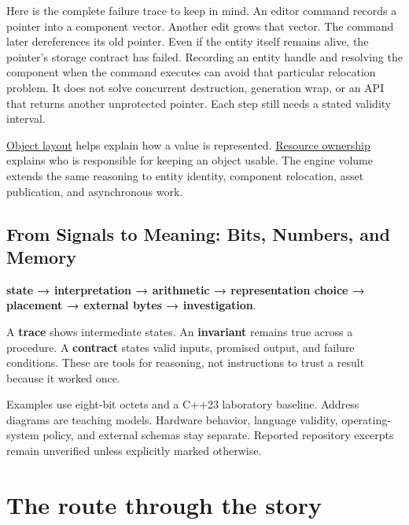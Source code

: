 Here is the complete failure trace to keep in mind. An editor command records a pointer into a component vector. Another edit grows that vector. The command later dereferences its old pointer. Even if the entity itself remains alive, the pointer's storage contract has failed. Recording an entity handle and resolving the component when the command executes can avoid that particular relocation problem. It does not solve concurrent destruction, generation wrap, or an API that returns another unprotected pointer. Each step still needs a stated validity interval.

\hyperref[appendix-c4ac6bb0fff8]{Object layout} helps explain how a value is represented. \hyperref[appendix-69739d3ab49b]{Resource ownership} explains who is responsible for keeping an object usable. The engine volume extends the same reasoning to entity identity, component relocation, asset publication, and asynchronous work.

\subsection{From Signals to Meaning: Bits, Numbers, and Memory}\label{01-foundations-i-ch001-from-signals-to-meaning-bits-numbers-and-memory}

\textbf{state → interpretation → arithmetic → representation choice → placement → external bytes → investigation}.

A \textbf{trace} shows intermediate states. An \textbf{invariant} remains true across a procedure. A \textbf{contract} states valid inputs, promised output, and failure conditions. These are tools for reasoning, not instructions to trust a result because it worked once.

Examples use eight-bit octets and a C++23 laboratory baseline. Address diagrams are teaching models. Hardware behavior, language validity, operating-system policy, and external schemas stay separate. Reported repository excerpts remain unverified unless explicitly marked otherwise.

\section{The route through the story}\label{01-foundations-i-ch001-the-route-through-the-story}


